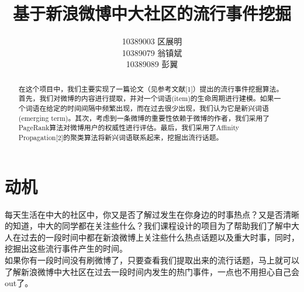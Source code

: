 \documentclass[a4paper]{article}
\title{基于新浪微博中大社区的流行事件挖掘}
\author{10389003 区展明 \\ 10389079 翁镇斌 \\ 10389089 彭翼}
\begin{document}
\maketitle


\begin{abstract}在这个项目中，我们主要实现了一篇论文（见参考文献[1]）提出的流行事件挖掘算法。首先，我们对微博的内容进行提取，并对一个词语(item)的生命周期进行建模。如果一个词语在给定的时间间隔中频繁出现，而在过去很少出现，我们认为它是新兴词语(emerging term)。其次，考虑到一条微博的重要性依赖于微博的作者，我们采用了PageRank算法对微博用户的权威性进行评估。最后，我们采用了Affinity Propagation[2]的聚类算法将新兴词语联系起来，挖掘出流行话题。
\end{abstract}




\section{动机}
每天生活在中大的社区中，你又是否了解过发生在你身边的时事热点？又是否清晰的知道，中大的同学都在关注些什么？我们课程设计的项目为了帮助我们了解中大人在过去的一段时间中都在新浪微博上关注些什么热点话题以及重大时事，同时，挖掘出这些流行事件产生的时间。\\
\indent 如果你有一段时间没有刷微博了，只要查看我们提取出来的流行话题，马上就可以了解新浪微博中大社区在过去一段时间内发生的热门事件，一点也不用担心自己会out了。
\end{document}
